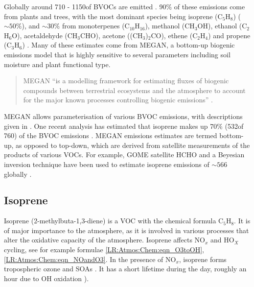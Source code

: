     Globally around 710 - 1150\tgcpyr of BVOCs are emitted \parencite{Guenther1995,Lathiere2006,Guenther2012, Messina2016}.
    90\% of these emissions come from plants and trees, with the most dominant species being isoprene (C$_5$H$_8$) ($\sim50\%$), and $\sim30\%$ from monoterpenes (C$_10$H$_16$), methanol (CH$_3$OH), ethanol (C$_2$H$_6$O), acetaldehyde (CH$_3$CHO), acetone ((CH$_3$)$_2$CO), ethene (C$_2$H$_4$) and propene (C$_3$H$_6$) \parencite{Guenther2012}.
    Many of these estimates come from MEGAN, a bottom-up biogenic emissions model that is highly sensitive to several parameters including soil moisture and plant functional type.
    \begin{quote}
      MEGAN ``is a modelling framework for estimating fluxes of biogenic compounds between terrestrial ecosystems and the atmosphere to account for the major known processes controlling biogenic emissions'' \parencite{Guenther2012}.
    \end{quote}
    MEGAN allows parameterisation of various BVOC emissions, with descriptions given in \textcite{Guenther2012}.
    One recent analysis has estimated that isoprene makes up 70\% (532\tgcpyr of 760\tgcpyr) of the BVOC emissions \parencite{Sindelarova2014}.
    MEGAN emissions estimates are termed bottom-up, as opposed to top-down, which are derived from satellite measurements of the products of various VOCs.
    For example, GOME satellite HCHO and a Beyesian inversion technique have been used to estimate isoprene emissions of $\sim566$\tgcpyr globally \parencite{Shim2005}. 
    
    
    
    
    
  \subsection{Isoprene}
  \label{LR:VOCs:Isop}
    Isoprene (2-methylbuta-1,3-diene) is a VOC with the chemical formula C$_5$H$_8$. 
    It is of major importance to the atmosphere, as it is involved in various processes that alter the oxidative capacity of the atmosphere.
    Isoprene affects NO$_x$ and HO$_X$ cycling, see for example formulae \ref{LR:Atmos:Chem:eqn_O3toOH}, \ref{LR:Atmos:Chem:eqn_NOandO3}.
    In the presence of NO$_x$, isoprene forms tropospheric ozone and SOAs \parencite{Wagner2002, Millet2006}.
    It has a short lifetime during the day, roughly an hour due to OH oxidation \parencite{AtkinsonArey2003}).
    
